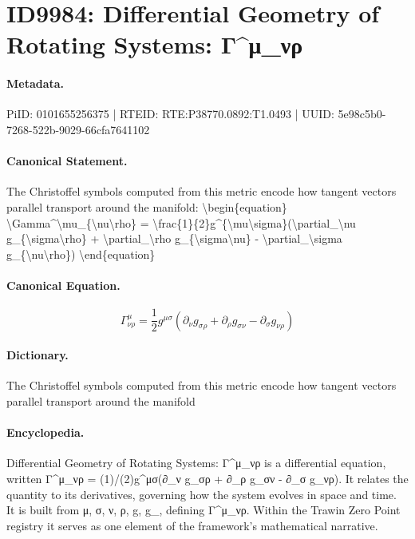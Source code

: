 \section*{ID9984: Differential Geometry of Rotating Systems: Γ\textasciicircum{}μ\_νρ}
\paragraph{Metadata.}
PiID: 0101655256375 | RTEID: RTE:P38770.0892:T1.0493 | UUID: 5e98c5b0-7268-522b-9029-66cfa7641102

\paragraph{Canonical Statement.}
The Christoffel symbols computed from this metric encode how tangent vectors parallel transport around the manifold: \textbackslash{}begin\{equation\} \textbackslash{}Gamma\textasciicircum{}\textbackslash{}mu\_\{\textbackslash{}nu\textbackslash{}rho\} = \textbackslash{}frac\{1\}\{2\}g\textasciicircum{}\{\textbackslash{}mu\textbackslash{}sigma\}(\textbackslash{}partial\_\textbackslash{}nu g\_\{\textbackslash{}sigma\textbackslash{}rho\} + \textbackslash{}partial\_\textbackslash{}rho g\_\{\textbackslash{}sigma\textbackslash{}nu\} - \textbackslash{}partial\_\textbackslash{}sigma g\_\{\textbackslash{}nu\textbackslash{}rho\}) \textbackslash{}end\{equation\}

\paragraph{Canonical Equation.}
\[
\Gamma^\mu_{\nu\rho} = \frac{1}{2}g^{\mu\sigma}(\partial_\nu g_{\sigma\rho} + \partial_\rho g_{\sigma\nu} - \partial_\sigma g_{\nu\rho})
\]

\paragraph{Dictionary.}
The Christoffel symbols computed from this metric encode how tangent vectors parallel transport around the manifold

\paragraph{Encyclopedia.}
Differential Geometry of Rotating Systems: Γ\textasciicircum{}μ\_νρ is a differential equation, written Γ\textasciicircum{}μ\_νρ = (1)/(2)g\textasciicircum{}μσ(∂\_ν g\_σρ + ∂\_ρ g\_σν - ∂\_σ g\_νρ). It relates the quantity to its derivatives, governing how the system evolves in space and time. It is built from μ, σ, ν, ρ, g, g\_, defining Γ\textasciicircum{}μ\_νρ. Within the Trawin Zero Point registry it serves as one element of the framework's mathematical narrative.
